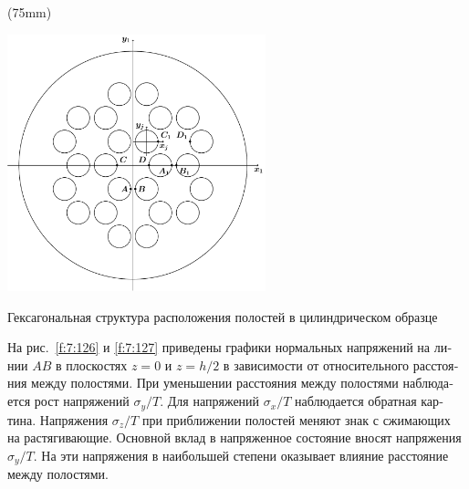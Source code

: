 \begin{russian}
\sidefig*(75mm){
\includegraphics[width=7.5cm]{hexagonal.pdf}
\caption{Гексагональная структура расположения полостей в цилиндрическом образце}
\label{f:7:21}
}{
На рис.~\ref{f:7:126} и \ref{f:7:127} приведены графики нормальных напряжений на линии $AB$ в плоскостях $z=0$ и $z=h/2$ в зависимости от относительного расстояния между полостями. При уменьшении расстояния между полостями наблюдается рост напряжений $\sigma_y/T$. Для напряжений $\sigma_x/T$ наблюдается обратная картина. Напряжения $\sigma_z/T$ при приближении полостей меняют знак с сжимающих на растягивающие. Основной вклад в напряженное состояние вносят напряжения $\sigma_y/T$. На эти напряжения в наибольшей степени оказывает влияние расстояние между полостями.
}


\end{russian}
